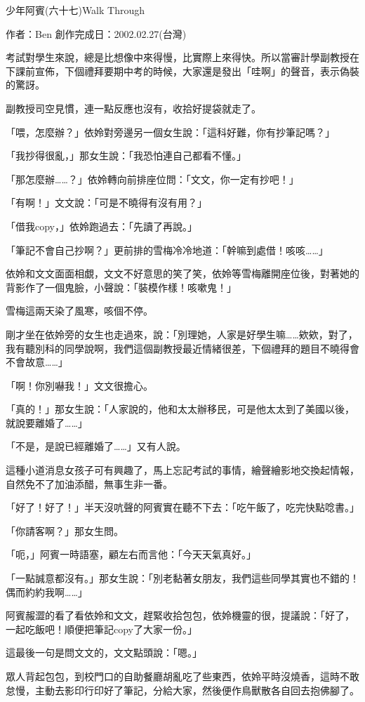 少年阿賓(六十七)Walk Through

作者：Ben
創作完成日：2002.02.27(台灣)


考試對學生來說，總是比想像中來得慢，比實際上來得快。所以當審計學副教授在下課前宣佈，下個禮拜要期中考的時候，大家還是發出「哇啊」的聲音，表示偽裝的驚訝。

副教授司空見慣，連一點反應也沒有，收拾好提袋就走了。

「喂，怎麼辦？」依姈對旁邊另一個女生說：「這科好難，你有抄筆記嗎？」

「我抄得很亂，」那女生說：「我恐怕連自己都看不懂。」

「那怎麼辦……？」依姈轉向前排座位問：「文文，你一定有抄吧！」

「有啊！」文文說：「可是不曉得有沒有用？」

「借我copy，」依姈跑過去：「先讀了再說。」

「筆記不會自己抄啊？」更前排的雪梅冷冷地道：「幹嘛到處借！咳咳……」

依姈和文文面面相覷，文文不好意思的笑了笑，依姈等雪梅離開座位後，對著她的背影作了一個鬼臉，小聲說：「裝模作樣！咳嗽鬼！」

雪梅這兩天染了風寒，咳個不停。

剛才坐在依姈旁的女生也走過來，說：「別理她，人家是好學生嘛……欸欸，對了，我有聽別科的同學說啊，我們這個副教授最近情緒很差，下個禮拜的題目不曉得會不會故意……」

「啊！你別嚇我！」文文很擔心。

「真的！」那女生說：「人家說的，他和太太辦移民，可是他太太到了美國以後，就說要離婚了……」

「不是，是說已經離婚了……」又有人說。

這種小道消息女孩子可有興趣了，馬上忘記考試的事情，繪聲繪影地交換起情報，自然免不了加油添醋，無事生非一番。

「好了！好了！」半天沒吭聲的阿賓實在聽不下去：「吃午飯了，吃完快點唸書。」

「你請客啊？」那女生問。

「呃，」阿賓一時語塞，顧左右而言他：「今天天氣真好。」

「一點誠意都沒有。」那女生說：「別老黏著女朋友，我們這些同學其實也不錯的！偶而約約我啊……」

阿賓赧澀的看了看依姈和文文，趕緊收拾包包，依姈機靈的很，提議說：「好了，一起吃飯吧！順便把筆記copy了大家一份。」

這最後一句是問文文的，文文點頭說：「嗯。」

眾人背起包包，到校門口的自助餐廳胡亂吃了些東西，依姈平時沒燒香，這時不敢怠慢，主動去影印行印好了筆記，分給大家，然後便作鳥獸散各自回去抱佛腳了。

